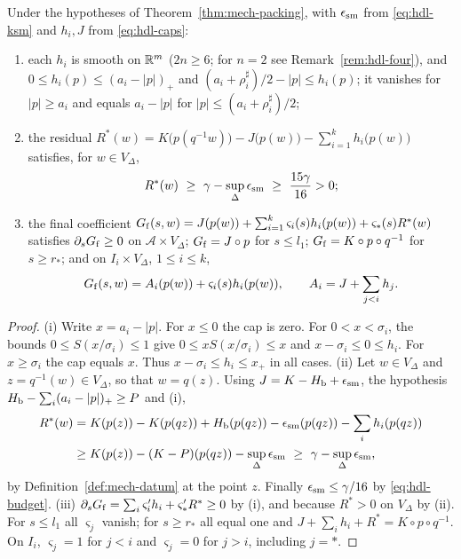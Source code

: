\begin{proposition}[Layers]\label{prop:hdl-layers}
Under the hypotheses of Theorem~\ref{thm:mech-packing}, with $\epsilon_{\rm sm}$ from \eqref{eq:hdl-ksm} and $h_i,J$ from \eqref{eq:hdl-caps}:
\begin{enumerate}[label=(\roman*)]
\item each $h_i$ is smooth on $\mathbb{R}^m$ ($2n\ge6$; for $n=2$ see Remark~\ref{rem:hdl-four}), and
$0\le h_i(p)\le(a_i-|p|)_+$ and $(a_i+\rho_i^\sharp)/2-|p|\le h_i(p)$;
it vanishes for $|p|\ge a_i$ and equals $a_i-|p|$ for $|p|\le(a_i+\rho_i^\sharp)/2$;
\item the residual $R^*(w)=K\big(p(q^{-1}w)\big)-J\big(p(w)\big)-\sum_{i=1}^kh_i\big(p(w)\big)$ satisfies, for $w\in V_\Delta$,
\[
 R^*(w)\ \ge\ \gamma-\sup_\Delta\epsilon_{\rm sm}\ \ge\ \frac{15\gamma}{16}>0 ;
\]
\item the final coefficient
$G_{\rm f}(s,w)=J(p(w))+\sum_{i=1}^k\varsigma_i(s)h_i(p(w))+\varsigma_*(s)R^*(w)$ satisfies  $\partial_sG_{\rm f}\ge0$ on
$\mathcal A\times V_\Delta$; $G_{\rm f}=J\circ p$ for $s\le l_1$; $G_{\rm f}=K\circ p\circ q^{-1}$ for
$s\ge r_*$; and on $I_i\times V_\Delta$, $1\le i\le k$,
\[
 G_{\rm f}(s,w)=A_i(p(w))+\varsigma_i(s)h_i(p(w)),\qquad A_i=J+\sum_{j<i}h_j .
\]
\end{enumerate}
\end{proposition}

\begin{proof}
(i) Write $x=a_i-|p|$. For $x\le0$ the cap is zero. For $0<x<\sigma_i$, the bounds
$0\le S(x/\sigma_i)\le1$ give $0\le xS(x/\sigma_i)\le x$ and $x-\sigma_i\le0\le h_i$.
For $x\ge \sigma_i$ the cap equals $x$. Thus $x-\sigma_i\le h_i\le x_+$ in all cases.
(ii) Let $w\in V_\Delta$ and $z=q^{-1}(w)\in V_\Delta$, so that $w=q(z)$. Using $J=K-H_{\mathrm b}+\epsilon_{\rm sm}$, the hypothesis
$H_{\mathrm b}-\sum_i(a_i-|p|)_+\ge P$ and (i),
\begin{align*}
R^*(w)&=K(p(z))-K(p(qz))+H_{\mathrm b}(p(qz))-\epsilon_{\rm sm}(p(qz))-\sum_ih_i(p(qz))\\
&\ge K(p(z))-(K-P)(p(qz))-\sup_\Delta\epsilon_{\rm sm}
\ \ge\ \gamma-\sup_\Delta\epsilon_{\rm sm},
\end{align*}
by Definition~\ref{def:mech-datum} at the point $z$. Finally $\epsilon_{\rm sm}\le\gamma/16$ by \eqref{eq:hdl-budget}.
(iii) $\partial_sG_{\rm f}=\sum_i\varsigma_i'h_i+\varsigma_*'R^*\ge0$ by (i), and because $R^*>0$ on $V_\Delta$ by (ii). For $s\le l_1$ all $\varsigma_j$ vanish; for $s\ge r_*$
all equal one and $J+\sum_ih_i+R^*=K\circ p\circ q^{-1}$. On $I_i$, $\varsigma_j=1$ for $j<i$ and $\varsigma_j=0$ for $j>i$,
including $j=*$.
\end{proof}

